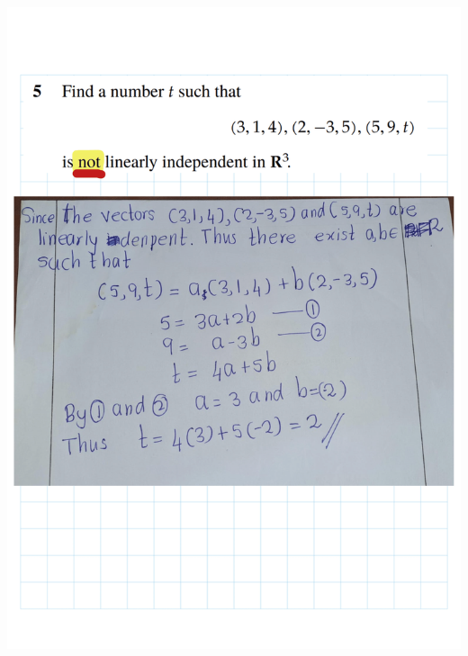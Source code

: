 \documentclass[
]{book}
\theoremstyle{definition}
\theoremstyle{definition}
\theoremstyle{definition}
\theoremstyle{definition}
\theoremstyle{remark}
\begin{document}
\includegraphics{fig/Ex2A/Ex2A-07.png}
\end{document}
